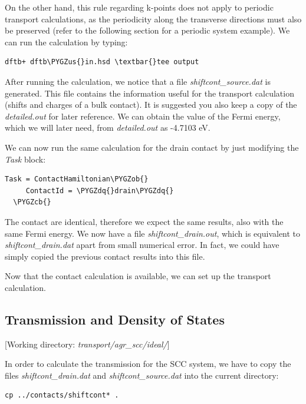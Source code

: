 \documentclass[a4paper,11pt,english]{sphinxmanual}
\def\PYGZus{\char`\_}
\def\PYGZob{\char`\{}
\def\PYGZcb{\char`\}}
\def\PYGZdq{\char`\"}
\begin{document}
{{On the other hand, this rule regarding k-points does not apply to
periodic transport calculations, as the periodicity along the
transverse directions must also be preserved (refer to the following
section for a periodic system example). We can run the calculation by
typing:

\begin{Verbatim}[commandchars=\\\{\}]
dftb+ dftb\PYGZus{}in.hsd \textbar{}tee output
\end{Verbatim}

After running the calculation, we notice that a file
\emph{shiftcont\_source.dat} is generated. This file contains the
information useful for the transport calculation (shifts and charges
of a bulk contact). It is suggested you also keep a copy of the
\emph{detailed.out} for later reference. We can obtain the value of the
Fermi energy, which we will later need, from \emph{detailed.out} as -4.7103
eV.

We can now run the same calculation for the drain contact by just
modifying the \emph{Task} block:

\begin{Verbatim}[commandchars=\\\{\}]
Task = ContactHamiltonian\PYGZob{}
     ContactId = \PYGZdq{}drain\PYGZdq{}
  \PYGZcb{}
\end{Verbatim}

The contact are identical, therefore we expect the same results, also
with the same Fermi energy. We now have a file \emph{shiftcont\_drain.out},
which is equivalent to \emph{shiftcont\_drain.dat} apart from small
numerical error. In fact, we could have simply copied the previous
contact results into this file.

Now that the contact calculation is available, we can set up the
transport calculation.


\subsection{Transmission and Density of States}
\label{transport:id3}
{[}Working directory: \emph{transport/agr\_scc/ideal/}{]}

In order to calculate the transmission for the SCC system, we have to
copy the files \emph{shiftcont\_drain.dat} and \emph{shiftcont\_source.dat} into
the current directory:

\begin{Verbatim}[commandchars=\\\{\}]
cp ../contacts/shiftcont* .
\end{Verbatim}

}}
\end{document}
